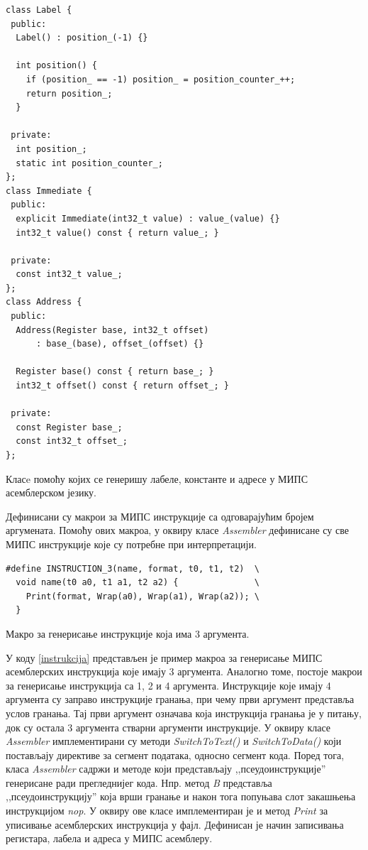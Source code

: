 \documentclass[12pt,oneside]{memoir}
\begin{document}
\begin{listing}
\begin{verbatim}
class Label {
 public:
  Label() : position_(-1) {}

  int position() {
    if (position_ == -1) position_ = position_counter_++;
    return position_;
  }

 private:
  int position_;
  static int position_counter_;
}; 
class Immediate {
 public:
  explicit Immediate(int32_t value) : value_(value) {}
  int32_t value() const { return value_; }

 private:
  const int32_t value_;
};
class Address {
 public:
  Address(Register base, int32_t offset)
      : base_(base), offset_(offset) {}

  Register base() const { return base_; }
  int32_t offset() const { return offset_; }

 private:
  const Register base_;
  const int32_t offset_;
};
\end{verbatim}
\caption{Класe помоћу којих се генеришу лабеле, константе и адресе у МИПС асемблерском језику.}
\label{konstanta}
\end{listing}

Дефинисани су макрои за МИПС инструкције са одговарајућим бројем аргумената. Помоћу ових макроа, у оквиру класе \textit{Assembler} дефинисане су све МИПС инструкције које су потребне при интерпретацији.\\

\begin{listing}
\begin{verbatim}
#define INSTRUCTION_3(name, format, t0, t1, t2)  \
  void name(t0 a0, t1 a1, t2 a2) {               \
    Print(format, Wrap(a0), Wrap(a1), Wrap(a2)); \
  }
\end{verbatim}
\caption{Макро за генерисање инструкције која има 3 аргумента.}
\label{instrukcija}
\end{listing}

У коду \ref{instrukcija} представљен је пример макроа за генерисање МИПС асемблерских инструкција које имају 3 аргумента. Аналогно томе, постоје макрои за генерисање инструкција са 1, 2 и 4 аргумента. Инструкције које имају 4 аргумента су заправо инструкције гранања, при чему први аргумент представља услов гранања. Тај први аргумент означава која инструкција гранања је у питању, док су остала 3 аргумента стварни аргументи инструкције.
У оквиру класе \textit{Assembler} имплементирани су методи \textit{SwitchToText()} и \textit{SwitchToData()} који постављају директиве за сегмент података, односно сегмент кода. Поред тога, класа \textit{Assembler} садржи и методе који представљају ,,псеудоинструкције'' генерисане ради прегледнијег кода. Нпр. метод \textit{B} представља ,,псеудоинструкцију'' која врши гранање и након тога попуњава слот закашњења инструкцијом \textit{nop}. 
У оквиру ове класе имплементиран је и метод \textit{Print} за уписивање асемблерских инструкција у фајл. Дефинисан је начин записивања регистара, лабела и адреса у МИПС асемблеру.\\
\end{document}
